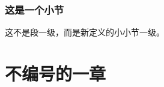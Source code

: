 \documentclass{ctexart}
\newcounter{subsubsubsection}
\begin{document}
        \subsubsection{这是一个小节}
                这不是段一级，而是新定义的小小节一级。

\section*{不编号的一章}
 
\end{document}
